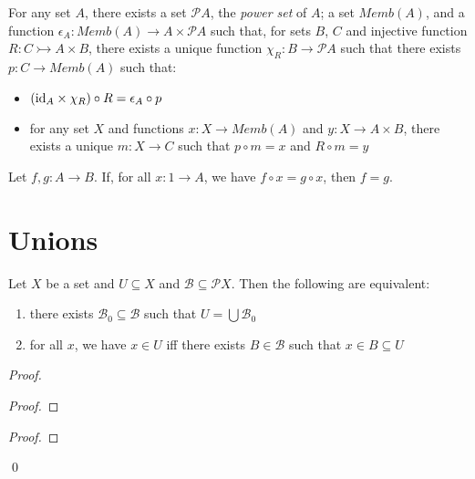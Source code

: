 \begin{ax}
  For any set $A$, there exists a set $\mathcal{P} A$, the \emph{power set} of $A$; a set $Memb(A)$, and a function $\epsilon_A : Memb(A) \rightarrow A \times \mathcal{P} A$ such that, for sets $B$, $C$ and injective function $R : C \rightarrowtail A \times B$, there exists a unique function $\chi_R : B \rightarrow \mathcal{P} A$ such that
  there exists $p : C \rightarrow Memb(A)$ such that:
  \begin{itemize}
    \item
    $(\mathrm{id}_{A} \times \chi_R) \circ R = \epsilon_A \circ p$
    \item
    for any set $X$ and functions $x : X \rightarrow Memb(A)$ and $y : X \rightarrow A \times B$, there exists a unique $m : X \rightarrow C$ such that $p \circ m = x$ and $R \circ m = y$
  \end{itemize}
\end{ax}

\begin{ax}
  Let $f, g : A \rightarrow B$. If, for all $x : 1 \rightarrow A$, we have $f \circ x = g \circ x$, then $f = g$.
\end{ax}

\section{Unions}

\begin{prop}
  \label{prop:set_theory:unions}
  Let $X$ be a set and $U \subseteq X$ and $\mathcal{B} \subseteq \mathcal{P} X$. Then the following are equivalent:
  \begin{enumerate}
    \item there exists $\mathcal{B}_0 \subseteq \mathcal{B}$ such that $U = \bigcup \mathcal{B}_0$
    \item for all $x$, we have $x \in U$ iff there exists $B \in \mathcal{B}$ such that $x \in B \subseteq U$
  \end{enumerate}
\end{prop}

\begin{proof}
  \pf
  \begin{proof}
  \end{proof}
  \begin{proof}
  \end{proof}
  \qed
\end{proof}

